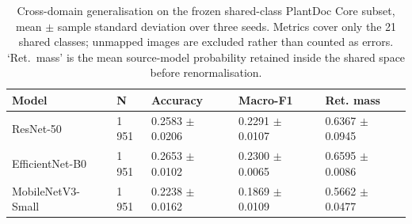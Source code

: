 \begin{table}[htbp]
\caption{Cross-domain generalisation on the frozen shared-class PlantDoc Core subset, mean $\pm$ sample standard deviation over three seeds. Metrics cover only the 21 shared classes; unmapped images are excluded rather than counted as errors. `Ret.\ mass' is the mean source-model probability retained inside the shared space before renormalisation.}
\label{tab:cross-domain-compact}
\footnotesize
\centering
\setlength{\tabcolsep}{5pt}
\begin{tabular}{lllll}
\toprule
Model & N & Accuracy & Macro-F1 & Ret. mass \\
\midrule
ResNet-50 & 1\,951 & 0.2583 $\pm$ 0.0206 & 0.2291 $\pm$ 0.0107 & 0.6367 $\pm$ 0.0945 \\
EfficientNet-B0 & 1\,951 & 0.2653 $\pm$ 0.0102 & 0.2300 $\pm$ 0.0065 & 0.6595 $\pm$ 0.0086 \\
MobileNetV3-Small & 1\,951 & 0.2238 $\pm$ 0.0162 & 0.1869 $\pm$ 0.0109 & 0.5662 $\pm$ 0.0477 \\
\bottomrule
\end{tabular}
\end{table}

